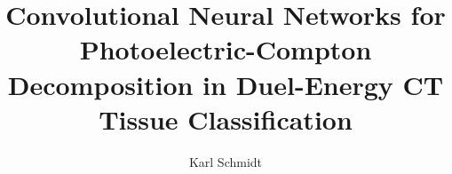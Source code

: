 \documentclass[sigconf]{acmart}
\begin{document}
\title{Convolutional Neural Networks for Photoelectric-Compton Decomposition in Duel-Energy CT Tissue Classification}

\author{Karl Schmidt}

\acmConference[ ]{ }{ }{}
\acmBooktitle{}
\renewcommand\footnotetextcopyrightpermission[1]{}



\maketitle









\end{document}
